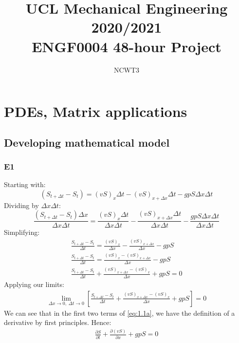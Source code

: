 \documentclass[11pt]{article}
\numberwithin{equation}{section}
\begin{document}
\title{\textbf{UCL Mechanical Engineering 2020/2021}\\ENGF0004 48-hour Project}
\author{NCWT3}
\maketitle
\tableofcontents
\listoffigures
\section{PDEs, Matrix applications}
\subsection{Developing mathematical model}
\subsubsection{E1}
Starting with:
\begin{equation}
    \left(S_{t+\Delta t} - S_t\right) = \left(vS\right)_x\Delta t - \left(vS\right)_{x+\Delta x} \Delta t-gpS\Delta x \Delta t
\end{equation}
Dividing by $\Delta x \Delta t$:
\begin{equation}
    \frac{\left(S_{t+\Delta t} - S_t\right)\Delta x }{\Delta x \Delta t} = \frac{\left(vS\right)_x\Delta t}{\Delta x \Delta t} - \frac{\left(vS\right)_{x+\Delta x}\Delta t}{\Delta x\Delta t} - \frac{gpS\Delta x\Delta t}{\Delta x \Delta t }
\end{equation}
Simplifying:
\begin{gather}
    \frac{S_{t+\Delta t} - S_t}{\Delta t} = \frac{\left(vS\right)_x}{\Delta x} - \frac{\left(vS\right)_{x+\Delta x}}{\Delta x} - gpS\\
    \frac{S_{t+\Delta t} - S_t}{\Delta t} = \frac{\left(vS\right)_x - \left(vS\right)_{x+\Delta x}}{\Delta x} - gpS\\
    \frac{S_{t+\Delta t} - S_t}{\Delta t}+\frac{\left(vS\right)_{x+\Delta x} - \left(vS\right)_x}{\Delta x} + gpS = 0
\end{gather}
Applying our limits:
\begin{gather}
    \lim_{\Delta x \rightarrow 0, \; \Delta t \rightarrow 0} \left[\frac{S_{t+\Delta t} - S_t}{\Delta t}+\frac{\left(vS\right)_{x+\Delta x} - \left(vS\right)_x}{\Delta x} + gpS \right]= 0 \label{eq:1.1a}
\end{gather}
We can see that in the first two terms of \ref{eq:1.1a}, we have the definition of a derivative by first principles. Hence:
\begin{gather}
    \frac{\partial S}{\partial t} + \frac{\partial \left(vS\right)}{\partial x} + gpS = 0
\end{gather}
\end{document}
